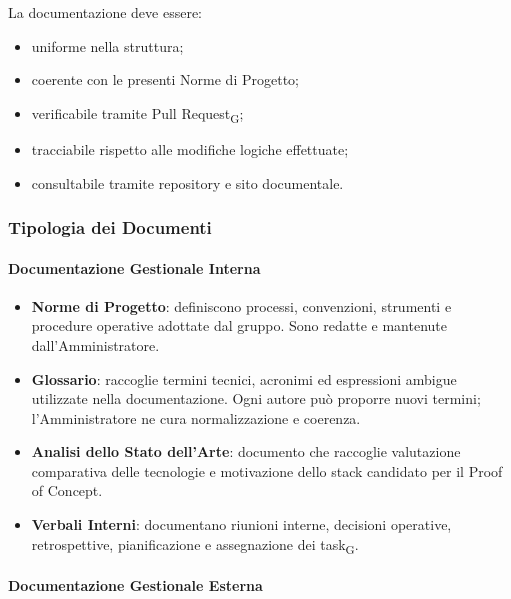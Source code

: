 La documentazione deve essere:
\begin{itemize}
    \item uniforme nella struttura;
    \item coerente con le presenti Norme di Progetto;
    \item verificabile tramite Pull Request\textsubscript{G};
    \item tracciabile rispetto alle modifiche logiche effettuate;
    \item consultabile tramite repository e sito documentale.
\end{itemize}


\subsubsection{Tipologia dei Documenti}

\paragraph{Documentazione Gestionale Interna}

\begin{itemize}
    \item \textbf{Norme di Progetto}: definiscono processi, convenzioni, strumenti
    e procedure operative adottate dal gruppo. Sono redatte e mantenute
    dall'Amministratore.

    \item \textbf{Glossario}: raccoglie termini tecnici, acronimi ed espressioni
    ambigue utilizzate nella documentazione. Ogni autore può proporre nuovi
    termini; l'Amministratore ne cura normalizzazione e coerenza.

    \item \textbf{Analisi dello Stato dell'Arte}: documento che raccoglie valutazione comparativa 
    delle tecnologie e motivazione dello stack candidato per il Proof of Concept.

    \item \textbf{Verbali Interni}: documentano riunioni interne, decisioni operative,
    retrospettive, pianificazione e assegnazione dei task\textsubscript{G}.
\end{itemize}

\paragraph{Documentazione Gestionale Esterna}

